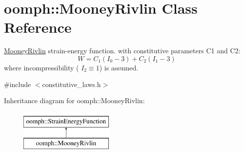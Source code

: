 \hypertarget{classoomph_1_1MooneyRivlin}{}\section{oomph\+:\+:Mooney\+Rivlin Class Reference}
\label{classoomph_1_1MooneyRivlin}


\hyperlink{classoomph_1_1MooneyRivlin}{Mooney\+Rivlin} strain-\/energy function. with constitutive parameters C1 and C2\+: \[ W = C_1 (I_0 - 3) + C_2 (I_1 - 3) \] where incompressibility ( $ I_2 \equiv 1$) is assumed.  




{\ttfamily \#include $<$constitutive\+\_\+laws.\+h$>$}

Inheritance diagram for oomph\+:\+:Mooney\+Rivlin\+:\begin{figure}[H]
\begin{center}
\leavevmode
\includegraphics[height=2.000000cm]{classoomph_1_1MooneyRivlin}
\end{center}
\end{figure}
